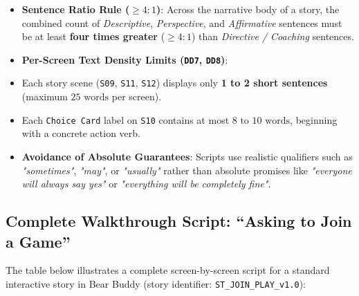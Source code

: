 \begin{itemize}
  \item \textbf{Sentence Ratio Rule ($\ge 4:1$)}: Across the narrative body of a story, the combined count of \textit{Descriptive}, \textit{Perspective}, and \textit{Affirmative} sentences must be at least \textbf{four times greater} ($\ge 4:1$) than \textit{Directive / Coaching} sentences.
  \item \textbf{Per-Screen Text Density Limits (\texttt{DD7}, \texttt{DD8})}:
  \item Each story scene (\texttt{S09}, \texttt{S11}, \texttt{S12}) displays only \textbf{1 to 2 short sentences} (maximum $25\text{ words}$ per screen).
  \item Each \texttt{Choice Card} label on \texttt{S10} contains at most \textbf{$8\text{ to }10\text{ words}$}, beginning with a concrete action verb.
  \item \textbf{Avoidance of Absolute Guarantees}: Scripts use realistic qualifiers such as \textit{"sometimes"}, \textit{"may"}, or \textit{"usually"} rather than absolute promises like \textit{"everyone will always say yes"} or \textit{"everything will be completely fine"}.
\end{itemize}



\subsection{Complete Walkthrough Script: ``Asking to Join a Game''}


The table below illustrates a complete screen-by-screen script for a standard interactive story in Bear Buddy (story identifier: \texttt{ST\_JOIN\_PLAY\_v1.0}):

